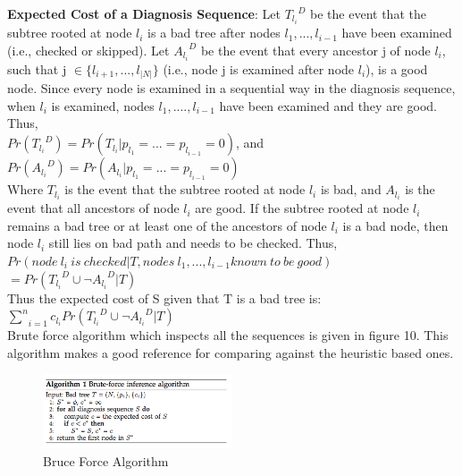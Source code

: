 \documentclass[10pt]{sigplan-proc-varsize}
\begin{document}
{\bf Expected Cost of  a Diagnosis Sequence}: Let ${T_{l_i}}^D$ be the event that the subtree rooted at node ${l_i}$ is a bad tree after nodes ${{l_1},...,{l_{i-1}}}$ have been examined (i.e., checked or skipped). Let ${A_{l_i}}^D$ be the event that every ancestor j of node ${l_i}$, such that j $\in\{l_{i+1},...,l_{|N|}\}$ (i.e., node j is examined after node ${l_i}$), is a good node. Since every node is examined in a sequential way in the diagnosis sequence, when $l_i$ is examined, nodes $l_1,....,l_{i-1}$ have been examined and they are good. Thus, \\
$Pr({T_{l_i}}^D) = Pr(T_{l_i}|p_{l_1}= ... = p_{l_{i-1}} = 0)$, and \\
$Pr({A_{l_i}}^D) = Pr(A_{l_i}|p_{l_1}= ... = p_{l_{i-1}} = 0)$ \\
Where $T_{l_i}$ is the event that the subtree rooted at node $l_i$ is bad, and $A_{l_i}$ is the event that all ancestors of node $l_i$ are good. If the subtree rooted at node $l_i$ remains a bad tree or at least one of the ancestors of node $l_i$ is a bad node, then node $l_i$ still lies on bad path and needs to be checked. Thus, \\
$ Pr(node\ l_i\ is\ checked| T, nodes\ l_1,...,l_{i-1} known\ to\ be\ good)$ \\
$=Pr({T_{l_i}}^D \cup \neg{{A_{l_i}}^D} | T)$\\
Thus the expected cost of S given that T is a bad tree is: \\
$ \underset{i=1}{\overset{n}{\sum}} c_{l_i} Pr({T_{l_i}}^D \cup \neg{{A_{l_i}}^D} | T)$\\
Brute force algorithm which inspects all the sequences is given in figure 10. This algorithm makes a good reference for comparing against the heuristic based ones.

\begin{figure}[h!]
  \caption{Bruce Force Algorithm}
  \centering
    \includegraphics[width=0.5\textwidth]{Fig10}
\end{figure}
\end{document}
